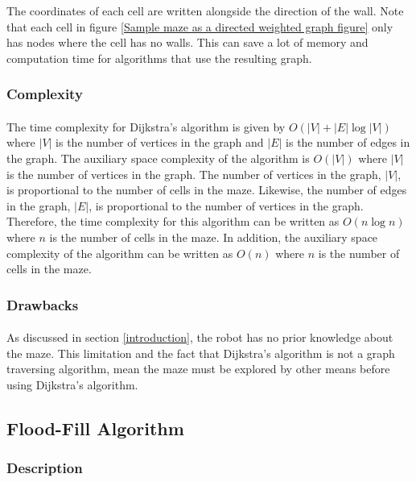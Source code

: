 \documentclass[12pt]{article}
\begin{document}
The coordinates of each \gls{cell} are written alongside the direction of the wall.
Note that each \gls{cell} in figure \ref{Sample maze as a directed weighted graph figure} only has nodes where the \gls{cell} has no walls. This can save a lot of memory and computation time for algorithms that use the resulting \gls{graph}.

\subsubsection{Complexity} \label{Dijkstra's Algorithm Complexity}
\paragraph{}
The time complexity for Dijkstra's algorithm is given by $O(|V| + |E|\log |V|)$ where $|V|$ is the number of vertices in the \gls{graph} and $|E|$ is the number of edges in the \gls{graph}.
The \gls{auxiliary space} complexity of the algorithm is $O(|V|)$ where $|V|$ is the number of vertices in the \gls{graph}.
The number of vertices in the \gls{graph}, $|V|$, is proportional to the number of \gls{cell}s in the \gls{maze}.
Likewise, the number of edges in the \gls{graph}, $|E|$, is proportional to the number of vertices in the \gls{graph}.
Therefore, the time complexity for this algorithm can be written as $O(n\log n)$ where $n$ is the number of \gls{cell}s in the \gls{maze}. 
In addition, the \gls{auxiliary space} complexity of the algorithm can be written as $O(n)$ where $n$ is the number of \gls{cell}s in the \gls{maze}.

\subsubsection{Drawbacks} \label{Dijkstra's algorithm drawbacks}
\paragraph{}
As discussed in section \ref{introduction}, the robot has no prior knowledge about the \gls{maze}.
This limitation and the fact that Dijkstra's algorithm is not a \gls{graph} traversing algorithm, mean the \gls{maze} must be explored by other means before using Dijkstra's algorithm. 

\subsection{Flood-Fill Algorithm} \label{Flood-Fill Algorithm}
\subsubsection{Description}
\end{document}
